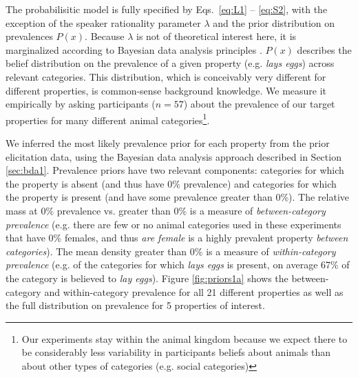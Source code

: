 \documentclass[10pt,letterpaper]{article}
\newcommand{\ndg}[1]{\textcolor{Green}{[ndg: #1]}}
\begin{document}
The probabilisitic model is fully specified by Eqs.~\eqref{eq:L1} -- \eqref{eq:S2}, with the exception of the speaker rationality parameter $\lambda$ and the prior distribution on prevalences $P(x)$. 
Because $\lambda$ is not of theoretical interest here, it is marginalized according to Bayesian data analysis principles \cite{LW2014}. 
 $P(x)$ describes the belief distribution on the prevalence of a given property (e.g. \emph{lays eggs}) across relevant categories. 
 This distribution, which is conceivably very different for different properties, is common-sense background knowledge. 
 We measure it empirically by asking participants ($n=57$) about the prevalence of our target properties for many different animal categories\footnote{Our experiments stay within the animal kingdom because we expect there to be considerably less variability in participants beliefs about animals than about other types of categories (e.g. social categories)}. 
 
We inferred the most likely prevalence prior for each property from the prior elicitation data, using the Bayesian data analysis approach described in Section \ref{sec:bda1}.	
Prevalence priors have two relevant components: categories for which the property is absent (and thus have 0\% prevalence) and categories for which the property is present (and have some prevalence greater than 0\%). 
The relative mass at 0\% prevalence vs. greater than 0\% is a measure of \emph{between-category prevalence} (e.g. there are few or no animal categories used in these experiments that have 0\% females, and thus \emph{are female} is a highly prevalent property \emph{between categories}).
The mean density greater than 0\% is a measure of \emph{within-category prevalence} (e.g. of the categories for which \emph{lays eggs} is present, on average 67\% of the category is believed to \emph{lay eggs}).
Figure \ref{fig:priors1a} shows the between-category and within-category prevalence for all 21 different properties as well as the full distribution on prevalence for 5 properties of interest.
\end{document}
